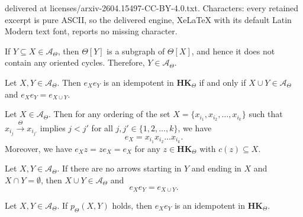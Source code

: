 \documentclass[10pt,a4paper]{amsart}
\newcommand{\hk}{\mathbf{HK}_{\Theta}}
\newcommand{\tot}{\overset{\Theta}{\to}}
\begin{document}
delivered at licenses/arxiv-2604.15497-CC-BY-4.0.txt. Characters: every retained excerpt is pure ASCII, so the delivered engine, XeLaTeX with its default Latin Modern text font, reports no missing character.
\begin{remark}\label{A-theta}
   If $Y \subseteq X \in \mathcal{A}_{\Theta}$, then $\Theta[Y]$ is a subgraph of $\Theta[X]$, and hence it does not contain any oriented cycles.
   Therefore, $Y \in \mathcal{A}_{\Theta}$.
\end{remark}

\begin{proposition}\label{hk_idempotents}
    Let $X, Y \in \mathcal{A}_{\Theta}$.
    Then $e_X e_Y$ is an idempotent in $\hk$ if and only if $X \cup Y \in \mathcal{A}_{\Theta}$ and $e_X e_Y = e_{X \cup Y}$.
\end{proposition}

\begin{lemma}\label{idempotent:formula}
   Let $X \in \mathcal{A}_{\Theta}$.
   Then for any ordering of the set $X = \{x_{i_1}, x_{i_2}, \dots, x_{i_k}\}$ such that $x_{i_j} \tot x_{i_{j'}}$ implies $j < j'$ for all $j, j' \in \{1, 2, \dots, k\}$, we have
   \[
   e_X = x_{i_1} x_{i_2} \dots x_{i_k}.
   \]
   Moreover, we have $e_X z = z e_X = e_X$ for any $z \in \hk$ with $c(z) \subseteq X$.
\end{lemma}

\begin{lemma}\label{IDS:no_arrows}
   Let $X, Y \in \mathcal{A}_{\Theta}$.
   If there are no arrows starting in $Y$ and ending in $X$ and $X \cap Y = \emptyset$, then $X \cup Y \in \mathcal{A}_{\Theta}$ and
   \[
   e_X e_Y = e_{X \cup Y}.
   \]
\end{lemma}

\begin{proposition}\label{prop2}
   Let $X, Y \in \mathcal{A}_{\Theta}$.
   If $p_{\Theta}(X, Y)$ holds, then $e_X e_Y$ is an idempotent in $\hk$.
\end{proposition}
\end{document}
